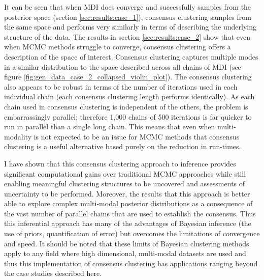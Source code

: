 \documentclass[12pt]{article} %
\begin{document}
	It can be seen that when MDI does converge and successfully samples from the posterior space (section \ref{sec:results:case_1}), consensus clustering samples from the same space and performs very similarly in terms of describing the underlying structure of the data. The results in section \ref{sec:results:case_2} show that even when MCMC methods struggle to converge, consensus clustering offers a description of the space of interest. Consensus clustering captures multiple modes in a similar distribution to the space described across all chains of MDI (see figure \ref{fig:gen_data_case_2_collapsed_violin_plot}). The consensus clustering also appears to be robust in terms of the number of iterations used in each individual chain (each consensus clustering length performs identically). As each chain used in consensus clustering is independent of the others, the problem is embarrassingly parallel; therefore 1,000 chains of 500 iterations is far quicker to run in parallel than a single long chain. This means that even when multi-modality is not expected to be an issue for MCMC methods that consensus clustering is a useful alternative based purely on the reduction in run-times.
	
	I have shown that this consensus clustering approach to inference provides significant computational gains over traditional MCMC approaches while still enabling meaningful clustering structures to be uncovered and assessments of uncertainty to be performed. Moreover, the results that this approach is better able to explore complex multi-modal posterior distributions as a consequence of the vast number of parallel chains that are used to establish the consensus. Thus this inferential approach has many of the advantages of Bayesian inference (the use of priors, quantification of error) but overcomes the limitations of convergence and speed. It should be noted that these limits of Bayesian clustering methods apply to any field where high dimensional, multi-modal datasets are used and thus this implementation of consensus clustering has applications ranging beyond the case studies described here.
	
	
\end{document}
